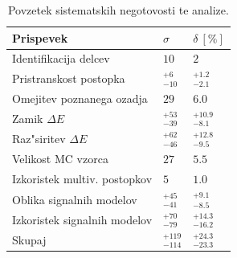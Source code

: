 \begin{otherlanguage}{slovene}
\begin{table}[H]
	\centering
	\begin{tabular}{l|l|l}
		Prispevek & $\sigma$ & $\delta~[\%]$ \\
		\toprule
		Identifikacija delcev & $10$ & $2$ \\
		Pristranskost postopka & $ {}^{+6}_{-10}$ & ${}^{+1.2}_{-2.1}$ \\
		Omejitev poznanega ozadja & $29$ & $6.0$ \\
		Zamik $\Delta E$ & ${}^{+53}_{-39}$ & ${}^{+10.9}_{-8.1}$ \\
		Raz"siritev $\Delta E$ & ${}^{+62}_{-46}$ & ${}^{+12.8}_{-9.5}$ \\
		Velikost MC vzorca & $27$ & $5.5$ \\
		Izkoristek multiv. postopkov & $5$ & $1.0$\\
		Oblika signalnih modelov & ${}^{+45}_{-41}$ & ${}^{+9.1}_{-8.5}$ \\
		Izkoristek signalnih modelov & ${}^{+70}_{-79}$ & ${}^{+14.3}_{-16.2}$ \\
		\midrule
		Skupaj & ${} ^{+119}_{-114}$ & ${}^{+24.3}_{-23.3}$ \\
		\bottomrule
	\end{tabular}
	\captionsetup{width=0.8\linewidth}
	\caption{Povzetek sistematskih negotovosti te analize.}
	\label{tab:sys_summary_si}
\end{table}

\end{otherlanguage}
